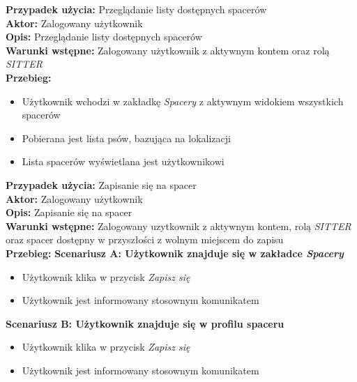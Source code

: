 \noindent
\textbf{Przypadek użycia:} Przeglądanie listy dostępnych spacerów\\
\textbf{Aktor:} Zalogowany użytkownik\\
\textbf{Opis:}  Przeglądanie listy dostępnych spacerów\\
\textbf{Warunki wstępne:} Zalogowany użytkownik z aktywnym kontem oraz rolą \textit{SITTER}\\
\textbf{Przebieg:}
\begin{itemize}
    \item Użytkownik wchodzi w zakładkę \textit{Spacery} z aktywnym widokiem wszystkich spacerów
    \item Pobierana jest lista psów, bazująca na lokalizacji
    \item Lista spacerów wyświetlana jest użytkownikowi
\end{itemize}

\noindent
\textbf{Przypadek użycia:} Zapisanie się na spacer\\
\textbf{Aktor:} Zalogowany użytkownik\\
\textbf{Opis:} Zapisanie się na spacer\\
\textbf{Warunki wstępne:} Zalogowany uzytkownik z aktywnym kontem, rolą \textit{SITTER} oraz spacer dostępny w przyszłości z wolnym miejscem do zapisu\\
\textbf{Przebieg:}
\textbf{Scenariusz A: Użytkownik znajduje się w zakładce \textit{Spacery}}
\begin{itemize}
    \item Użytkownik klika w przycisk \textit{Zapisz się}
    \item Użytkownik jest informowany stosownym komunikatem
\end{itemize}
\textbf{Scenariusz B: Użytkownik znajduje się w profilu spaceru}
\begin{itemize}
    \item Użytkownik klika w przycisk \textit{Zapisz się}
    \item Użytkownik jest informowany stosownym komunikatem
\end{itemize}

